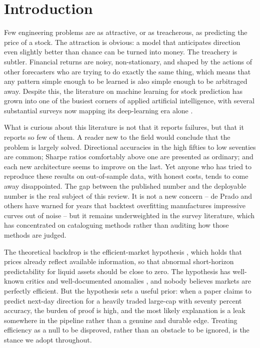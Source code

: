 \documentclass[10pt,a4paper,twocolumn]{article}
\begin{document}
\section{Introduction}

Few engineering problems are as attractive, or as treacherous, as predicting the price of a stock. The attraction is obvious: a model that anticipates direction even slightly better than chance can be turned into money. The treachery is subtler. Financial returns are noisy, non-stationary, and shaped by the actions of other forecasters who are trying to do exactly the same thing, which means that any pattern simple enough to be learned is also simple enough to be arbitraged away. Despite this, the literature on machine learning for stock prediction has grown into one of the busiest corners of applied artificial intelligence, with several substantial surveys now mapping its deep-learning era alone \cite{sezer2020,ozbayoglu2020,jiang2021}.

What is curious about this literature is not that it reports failures, but that it reports so few of them. A reader new to the field would conclude that the problem is largely solved. Directional accuracies in the high fifties to low seventies are common; Sharpe ratios comfortably above one are presented as ordinary; and each new architecture seems to improve on the last. Yet anyone who has tried to reproduce these results on out-of-sample data, with honest costs, tends to come away disappointed. The gap between the published number and the deployable number is the real subject of this review. It is not a new concern -- de Prado and others have warned for years that backtest overfitting manufactures impressive curves out of noise \cite{lopezdeprado2018,bailey2014} -- but it remains underweighted in the survey literature, which has concentrated on cataloguing methods rather than auditing how those methods are judged.

The theoretical backdrop is the efficient-market hypothesis \cite{fama1970}, which holds that prices already reflect available information, so that abnormal short-horizon predictability for liquid assets should be close to zero. The hypothesis has well-known critics and well-documented anomalies \cite{malkiel2003}, and nobody believes markets are perfectly efficient. But the hypothesis sets a useful prior: when a paper claims to predict next-day direction for a heavily traded large-cap with seventy percent accuracy, the burden of proof is high, and the most likely explanation is a leak somewhere in the pipeline rather than a genuine and durable edge. Treating efficiency as a null to be disproved, rather than an obstacle to be ignored, is the stance we adopt throughout.
\end{document}
